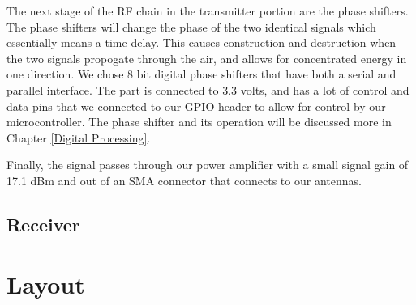 The next stage of the RF chain in the transmitter portion are the phase shifters. The phase shifters will change the phase
of the two identical signals which essentially means a time delay. This causes construction and destruction when the
two signals propogate through the air, and allows for concentrated energy in one direction. We chose 8 bit digital 
phase shifters that have both a serial and parallel interface. The part is connected to 3.3 volts, and has a lot of control and
data pins that we connected to our GPIO header to allow for control by our microcontroller. The phase shifter and its
operation will be discussed more in Chapter \ref{Digital Processing}. 

Finally, the signal passes through our power amplifier with a small signal gain of 17.1 dBm and out of an SMA connector
that connects to our antennas.

\subsection{Receiver}

\section{Layout}
\